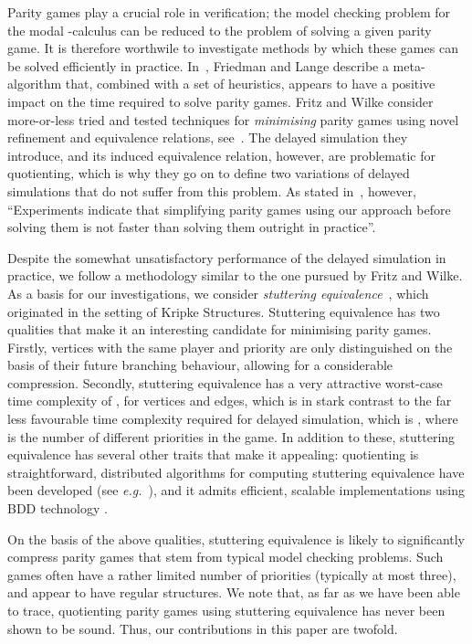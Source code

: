 \documentclass[a4paper]{llncs}
\newcommand{\eg}{\textit{e.g.}\xspace}
\begin{document}
Parity games play a crucial role in verification; the model checking
problem for the modal -calculus can be reduced to the problem of
solving a given parity game. It is therefore worthwile to investigate
methods by which these games can be solved efficiently in practice.
In~\cite{FL:09}, Friedman and Lange describe a meta-algorithm that,
combined with a set of heuristics, appears to have a positive impact
on the time required to solve parity games.  Fritz and Wilke consider
more-or-less tried and tested techniques for \emph{minimising} parity
games using novel refinement and equivalence relations, see~\cite{FW:06}.
The delayed simulation they introduce, and its induced equivalence
relation, however, are problematic for quotienting, which is why they go
on to define two variations of delayed simulations that do not suffer
from this problem. As stated in~\cite{Wil:05}, however, ``Experiments
indicate that simplifying parity games using our approach before solving
them is not faster than solving them outright in practice''.

Despite the somewhat unsatisfactory performance of the delayed simulation
in practice, we follow a methodology similar to the one pursued by
Fritz and Wilke. As a basis for our investigations, we consider 
\emph{stuttering equivalence}~\cite{BCG:88}, which originated in the 
setting of Kripke Structures. Stuttering equivalence has two
qualities that make it an interesting candidate for minimising parity
games. Firstly, vertices with the same player and priority are only 
distinguished on the basis of their future branching behaviour,
allowing for a considerable compression. Secondly, stuttering equivalence
has a very attractive worst-case time complexity of , for  vertices and  edges, which is in stark contrast to the
far less favourable time complexity required for delayed simulation,
which is , where  is the
number of different priorities in the game.  In addition to these,
stuttering equivalence has several other traits that make it appealing:
quotienting is straightforward, distributed algorithms for computing
stuttering equivalence have been developed (see \eg~\cite{BO:03}),
and it admits efficient, scalable implementations using BDD technology \cite{WHH+:06}.

On the basis of the above qualities, stuttering equivalence is likely to
significantly compress parity games that stem from typical model checking
problems.  Such games often have a rather limited number of priorities
(typically at most three), and appear to have regular structures. We note
that, as far as we have been able to trace, quotienting parity games
using stuttering equivalence has never been shown to be sound. Thus,
our contributions in this paper are twofold.
\end{document}
